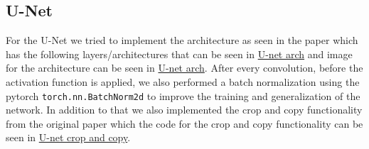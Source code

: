 \documentclass{article}
\begin{document}

\subsection{U-Net}
For the U-Net we tried to implement the architecture as seen in the paper \cite{ronneberger2015u} which has the following layers/architectures that can be seen in \hyperref[sec:unet_architecture]{U-net arch} and image for the architecture can be seen in \hyperref[fig:unet_architecture]{U-net arch}. After every convolution, before the activation function is applied, we also performed a batch normalization using the pytorch \texttt{torch.nn.BatchNorm2d} to improve the training and generalization of the network. In addition to that we also implemented the crop and copy functionality from the original paper which the code for the crop and copy functionality can be seen in \hyperref[sec:unet_crop_copy]{U-net crop and copy}.
\end{document}
